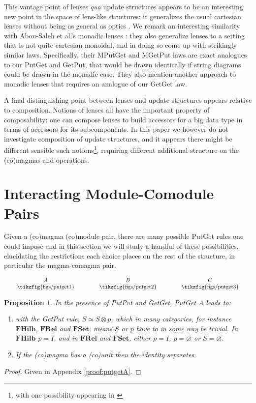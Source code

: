 \documentclass[submission,copyright,creativecommons,sharealike,noncommercial]{eptcs}
\newcommand{\tikzfigscale}[2]{\scalebox{#1}{\tikzfig{#2}}}
\newcommand{\fhilb}{\textbf{FHilb}}
\newcommand{\frel}{\textbf{FRel}}
\newcommand{\fset}{\textbf{FSet}}
\theoremstyle{definition}
\theoremstyle{plain}
\newtheorem{prop}{Proposition}
\theoremstyle{plain}
\begin{document}
This vantage point of lenses \emph{qua} update structures appears to be an interesting new point in the space of lens-like structures: it generalizes the usual cartesian lenses without being as general as optics \cite{rileyCategoriesOptics2018}. We remark an interesting similarity with Abou-Saleh et al.'s monadic lenses \cite{abou-saleh_reflections_2016}: they also generalize lenses to a setting that is not quite cartesian monoidal, and in doing so come up with strikingly similar laws. Specifically, their MPutGet and MGetPut laws are exact analogues to our PutGet and GetPut, that would be drawn identically if string diagrams could be drawn in the monadic case. They also mention another approach to monadic lenses that requires an analogue of our GetGet law.

A final distinguishing point between lenses and update structures appears relative to composition. Notions of lenses all have the important property of composability: one can compose lenses to build accessors for a big data type in terms of accessors for its subcomponents. In this paper we however do not investigate composition of update structures, and it appears there might be different sensible such notions\footnote{with one possibility appearing in \cite{hefford2020categories}}, requiring different additional structure on the (co)magmas and operations.


\section{Interacting Module-Comodule Pairs}
Given a (co)magma (co)module pair, there are many possible PutGet rules one could impose and in this section we will study a handful of these possibilities, elucidating the restrictions each choice places on the rest of the structure, in particular the magma-comagma pair.

\begin{equation*}
\arraycolsep=0.8cm
\begin{array}{ccc}
    A & B & C \\
    \tikzfigscale{1}{figs/putget1} & \tikzfigscale{1}{figs/putget2} &
    \tikzfigscale{1}{figs/putget3}
\end{array}
\end{equation*}

\begin{prop}\label{prop:putgetA}
    In the presence of PutPut and GetGet, PutGet A leads to:
    \begin{enumerate}
    \item with the GetPut rule, $S\simeq S\otimes p$, which in many categories, for instance $\fhilb$, $\frel$ and $\fset$, means $S$ or $p$ have to in some way be trivial. In $\fhilb$ $p=I$, and in $\frel$ and $\fset$, either $p=I$, $p=\varnothing$ or $S=\varnothing$.
    \item If the (co)magma has a (co)unit then the identity separates.

    \end{enumerate}
\end{prop}
\begin{proof}
Given in Appendix \ref{proof:putgetA}.
\end{proof}
\end{document}
